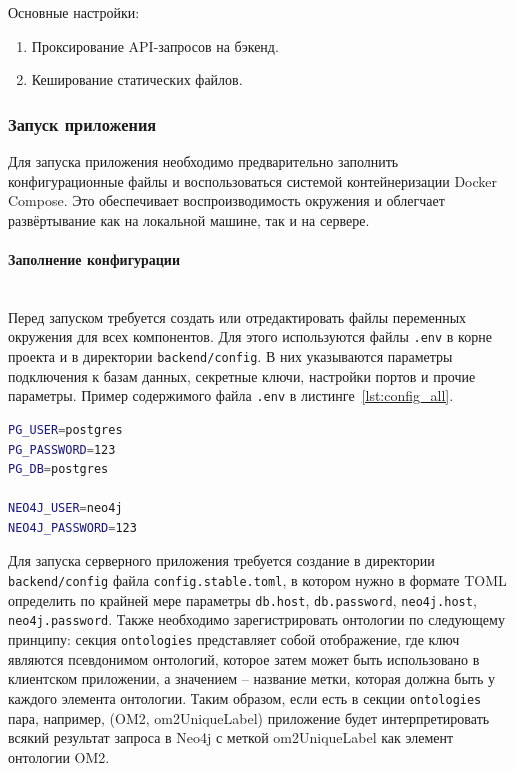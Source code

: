 Основные настройки:
\begin{enumerate}
    \item Проксирование API-запросов на бэкенд.
    \item Кеширование статических файлов.
\end{enumerate}

\subsubsection{Запуск приложения}

Для запуска приложения необходимо предварительно заполнить конфигурационные файлы и воспользоваться системой контейнеризации Docker Compose. Это обеспечивает воспроизводимость окружения и облегчает развёртывание как на локальной машине, так и на сервере.

\paragraph{Заполнение конфигурации} \mbox{}\\

Перед запуском требуется создать или отредактировать файлы переменных окружения для всех компонентов.
Для этого используются файлы \texttt{.env} в корне проекта и в директории \texttt{backend/config}.
В них указываются параметры подключения к базам данных, секретные ключи, настройки портов и прочие параметры.
Пример содержимого файла \texttt{.env} в листинге~\ref{lst:config_all}.
\begin{lstlisting}[frame=single, basicstyle=\footnotesize\ttfamily, label={lst:config_all}, caption={Заполнение конфигурационного файла всего приложения},captionpos=b, breaklines=true, breakatwhitespace=true, language=bash]
PG_USER=postgres
PG_PASSWORD=123
PG_DB=postgres

NEO4J_USER=neo4j
NEO4J_PASSWORD=123
\end{lstlisting}

Для запуска серверного приложения требуется создание в директории \texttt{backend/config} файла \texttt{config.stable.toml}, в котором нужно в формате TOML определить по крайней мере параметры \texttt{db.host}, \texttt{db.password}, \texttt{neo4j.host}, \texttt{neo4j.password}.
Также необходимо зарегистрировать онтологии по следующему принципу: секция \texttt{ontologies} представляет собой отображение, где ключ являются псевдонимом онтологий, которое затем может быть использовано в клиентском приложении, а значением – название метки, которая должна быть у каждого элемента онтологии.
Таким образом, если есть в секции \texttt{ontologies} пара, например, (OM2, om2UniqueLabel) приложение будет интерпретировать всякий результат запроса в Neo4j с меткой om2UniqueLabel как элемент онтологии OM2.

